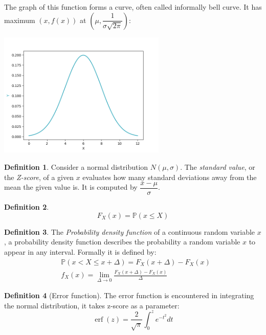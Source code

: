 \documentclass[11pt, a4paper]{article}
\theoremstyle{definition}
\newtheorem{definition}{Definition}
\begin{document}
		The graph of this function forms a curve, often called informally bell curve. It has maximum $(x,f(x))$ at $\left(\mu, \dfrac{1}{\sigma\sqrt{2\pi}}\right)$:
		\begin{center}
			\includegraphics[width=0.6\textwidth]{Normal_clean}
		\end{center}
		
		\begin{definition}
			\label{def:def2}
			Consider a normal distribution $N(\mu, \sigma)$. The \emph{standard value}, or the \emph{Z-score}, of a given $x$ evaluates how many standard deviations away from the mean the given value is. It is computed by $\dfrac{x-\mu}{\sigma}$.
		\end{definition}
	
		\begin{definition}
			\label{def:cumulative}
			$$F_{X}(x)=\mathbb{P}(x\leq X)$$
		\end{definition}
	
		\begin{definition}
			\label{def:def3}
			The \emph{Probability density function} of a continuous random variable $x$, a probability density function describes the probability a random variable $x$ to appear in any interval. Formally it is defined by:
			\begin{align*}
				&\mathbb{P}(x < X \leq x+\Delta)=F_X(x+\Delta)-F_X(x)\\
				&f_X(x)=\lim_{\Delta \rightarrow 0} \frac{F_X(x+\Delta)-F_X(x)}{\Delta}			
			\end{align*}
		\end{definition}
	
		\begin{definition}[Error function] The error function is encountered in integrating the normal distribution, it takes z-score as a parameter:
			$$\operatorname{erf}(z)=\dfrac{2}{\sqrt{\pi}}\int_{0}^{z}e^{-t^{2}}dt$$
		\end{definition}
	
\end{document}
